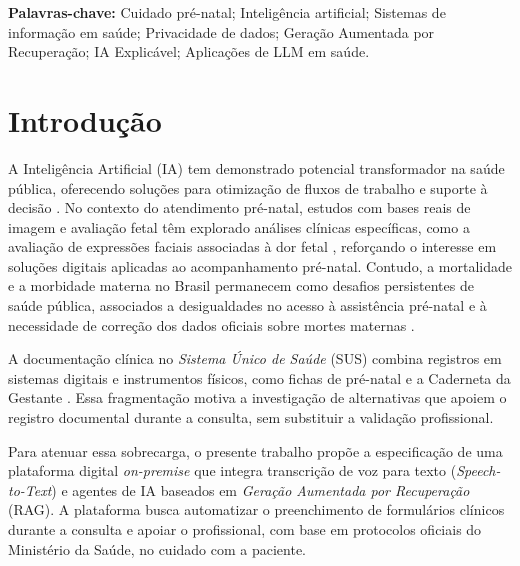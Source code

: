 \documentclass[12pt]{article}
\begin{document}
\noindent \textbf{Palavras-chave:} Cuidado pré-natal; Inteligência artificial; Sistemas de informação em saúde; Privacidade de dados; Geração Aumentada por Recuperação; IA Explicável; Aplicações de LLM em saúde.


\section{Introdução}

A Inteligência Artificial (IA) tem demonstrado potencial transformador na saúde pública, oferecendo soluções para otimização de fluxos de trabalho e suporte à decisão \cite{Rajpurkar2022, Cabitza2022}.
No contexto do atendimento pré-natal, estudos com bases reais de imagem e avaliação fetal têm explorado análises clínicas específicas, como a avaliação de expressões faciais associadas à dor fetal \cite{Rosa2020FetalPain, Bernardes2022FetalPain}, reforçando o interesse em soluções digitais aplicadas ao acompanhamento pré-natal.
Contudo, a mortalidade e a morbidade materna no Brasil permanecem como desafios persistentes de saúde pública, associados a desigualdades no acesso à assistência pré-natal e à necessidade de correção dos dados oficiais sobre mortes maternas \cite{AcessoPreNatal2018, Laurenti2010}.

A documentação clínica no \textit{Sistema Único de Saúde} (SUS) combina registros em sistemas digitais e instrumentos físicos, como fichas de pré-natal e a Caderneta da Gestante \cite{FichaPreNatal2018, CadernetaGestante2024}.
Essa fragmentação motiva a investigação de alternativas que apoiem o registro documental durante a consulta, sem substituir a validação profissional.

Para atenuar essa sobrecarga, o presente trabalho propõe a especificação de uma plataforma digital \textit{on-premise} que integra transcrição de voz para texto (\textit{Speech-to-Text}) e agentes de IA baseados em \textit{Geração Aumentada por Recuperação} (RAG).
A plataforma busca automatizar o preenchimento de formulários clínicos durante a consulta e apoiar o profissional, com base em protocolos oficiais do Ministério da Saúde, no cuidado com a paciente.
\end{document}
